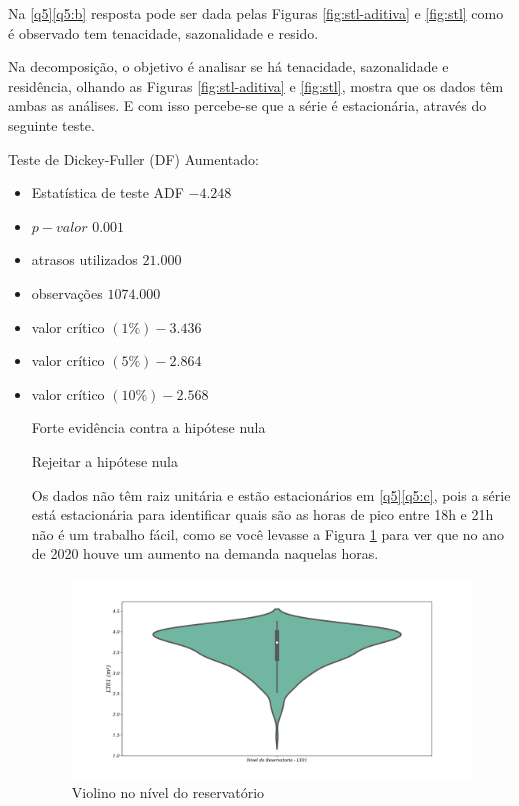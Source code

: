 Na \ref{q5}\ref{q5:b} resposta pode ser dada pelas Figuras \ref{fig:stl-aditiva} e \ref{fig:stl} como é observado tem tenacidade, sazonalidade e resido. 
 
Na decomposição, o objetivo é analisar se há tenacidade, sazonalidade e residência, olhando as Figuras \ref{fig:stl-aditiva} e \ref{fig:stl}, mostra que os dados têm ambas as análises. E com isso percebe-se que a série é estacionária, através do seguinte teste.

Teste de Dickey-Fuller (DF) Aumentado: 
\begin{itemize}
	\item Estatística de teste ADF     $-4.248$
\item $p-valor$                       $0.001$
\item atrasos utilizados         $21.000$
\item  observações              $1074.000$
\item valor crítico $(1\%)           -3.436$
\item valor crítico $(5\%)           -2.864$
\item valor crítico $(10\%)          -2.568$


Forte evidência contra a hipótese nula

Rejeitar a hipótese nula

Os dados não têm raiz unitária e estão estacionários em \ref{q5}\ref{q5:c}, pois a série está estacionária para identificar quais são as horas de pico entre 18h e 21h não é um trabalho fácil, como se você levasse a Figura \ref{fig:hist} para ver que no ano de 2020 houve um aumento na demanda naquelas horas.


\begin{figure}[H]
	\centering
	\caption{Violino no nível do reservatório}
	\label{fig:hist}
	\includegraphics[width=1\linewidth]{Resultados/Figuras/viol}
	

\end{figure}
\end{itemize}
